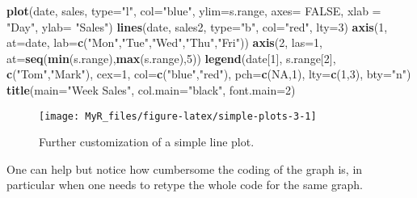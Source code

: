 \documentclass[]{book}
\newenvironment{Shaded}{}{}
\newcommand{\DataTypeTok}[1]{\textcolor[rgb]{0.56,0.13,0.00}{#1}}
\newcommand{\DecValTok}[1]{\textcolor[rgb]{0.25,0.63,0.44}{#1}}
\newcommand{\KeywordTok}[1]{\textcolor[rgb]{0.00,0.44,0.13}{\textbf{#1}}}
\newcommand{\NormalTok}[1]{#1}
\newcommand{\OtherTok}[1]{\textcolor[rgb]{0.00,0.44,0.13}{#1}}
\newcommand{\StringTok}[1]{\textcolor[rgb]{0.25,0.44,0.63}{#1}}
\theoremstyle{definition}
\theoremstyle{definition}
\theoremstyle{definition}
\theoremstyle{remark}
\begin{document}
\begin{Shaded}
\begin{Highlighting}[]
\KeywordTok{plot}\NormalTok{(date, sales, }\DataTypeTok{type=}\StringTok{"l"}\NormalTok{, }\DataTypeTok{col=}\StringTok{"blue"}\NormalTok{, }\DataTypeTok{ylim=}\NormalTok{s.range,}
      \DataTypeTok{axes=} \OtherTok{FALSE}\NormalTok{, }\DataTypeTok{xlab =} \StringTok{"Day"}\NormalTok{, }\DataTypeTok{ylab=} \StringTok{"Sales"}\NormalTok{)}
\KeywordTok{lines}\NormalTok{(date, sales2, }\DataTypeTok{type=}\StringTok{"b"}\NormalTok{, }\DataTypeTok{col=}\StringTok{"red"}\NormalTok{, }\DataTypeTok{lty=}\DecValTok{3}\NormalTok{)}
\KeywordTok{axis}\NormalTok{(}\DecValTok{1}\NormalTok{, }\DataTypeTok{at=}\NormalTok{date, }\DataTypeTok{lab=}\KeywordTok{c}\NormalTok{(}\StringTok{"Mon"}\NormalTok{,}\StringTok{"Tue"}\NormalTok{,}\StringTok{"Wed"}\NormalTok{,}\StringTok{"Thu"}\NormalTok{,}\StringTok{"Fri"}\NormalTok{))}
\KeywordTok{axis}\NormalTok{(}\DecValTok{2}\NormalTok{, }\DataTypeTok{las=}\DecValTok{1}\NormalTok{, }\DataTypeTok{at=}\KeywordTok{seq}\NormalTok{(}\KeywordTok{min}\NormalTok{(s.range),}\KeywordTok{max}\NormalTok{(s.range),}\DecValTok{5}\NormalTok{)) }
\KeywordTok{legend}\NormalTok{(date[}\DecValTok{1}\NormalTok{], s.range[}\DecValTok{2}\NormalTok{], }\KeywordTok{c}\NormalTok{(}\StringTok{"Tom"}\NormalTok{,}\StringTok{"Mark"}\NormalTok{), }\DataTypeTok{cex=}\DecValTok{1}\NormalTok{, }
   \DataTypeTok{col=}\KeywordTok{c}\NormalTok{(}\StringTok{"blue"}\NormalTok{,}\StringTok{"red"}\NormalTok{), }\DataTypeTok{pch=}\KeywordTok{c}\NormalTok{(}\OtherTok{NA}\NormalTok{,}\DecValTok{1}\NormalTok{), }\DataTypeTok{lty=}\KeywordTok{c}\NormalTok{(}\DecValTok{1}\NormalTok{,}\DecValTok{3}\NormalTok{), }\DataTypeTok{bty=}\StringTok{"n"}\NormalTok{)}
\KeywordTok{title}\NormalTok{(}\DataTypeTok{main=}\StringTok{"Week Sales"}\NormalTok{, }\DataTypeTok{col.main=}\StringTok{"black"}\NormalTok{, }\DataTypeTok{font.main=}\DecValTok{2}\NormalTok{)}
\end{Highlighting}
\end{Shaded}

\begin{figure}

{\centering \texttt{[image: MyR\_files/figure-latex/simple-plots-3-1]} 

}

\caption{Further customization of a simple line plot.}\label{fig:simple-plots-3}
\end{figure}

One can help but notice how cumbersome the coding of the graph is, in
particular when one needs to retype the whole code for the same graph.
\end{document}
